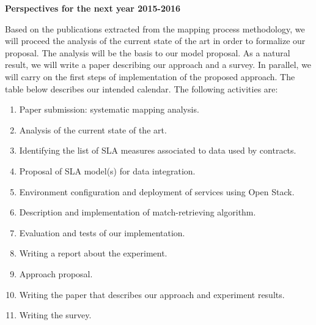 \documentclass[12pt,a4paper,oneside]{report}
\begin{document}
\begin{flushleft}
\textbf{Perspectives for the next year 2015-2016}\\
\end{flushleft}
Based on the publications extracted from the mapping process methodology, we will proceed the analysis of the current state of the art in order to formalize our proposal. The analysis will be the basis to our model proposal. As a natural result, we will write a paper describing our approach and a survey. In parallel, we will carry on the first steps of implementation of the proposed approach.
The table below describes our intended calendar. The following activities are:
\begin{enumerate}
\item Paper submission: systematic mapping analysis.
\item Analysis of the current state of the art.
\item Identifying the list of SLA measures associated to data used by contracts.
\item Proposal of SLA model(s) for data integration.
\item Environment configuration and deployment of services using Open Stack.
\item Description and implementation of match-retrieving algorithm.
\item Evaluation and tests of our implementation. 
\item Writing a report about the experiment.
\item Approach proposal.
\item Writing the paper that describes our approach and experiment results. 
\item Writing the survey. 
\end{enumerate}
\end{document}
